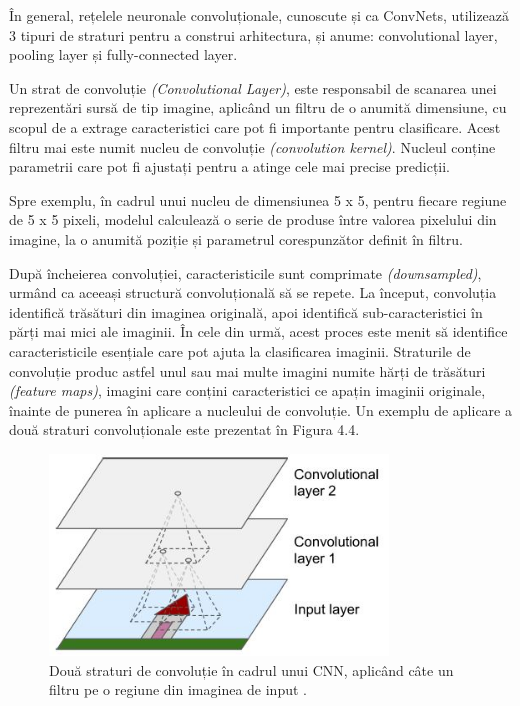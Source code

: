 \documentclass[a4paper,12pt]{report}
\begin{document}
În general, rețelele neuronale convoluționale, cunoscute și ca ConvNets, utilizează
3 tipuri de straturi pentru a construi arhitectura, și anume: convolutional layer, 
pooling layer și fully-connected layer. 

Un strat de convoluție \emph{(Convolutional Layer)}, este responsabil
de scanarea unei reprezentări sursă de tip imagine, aplicând un filtru de o anumită dimensiune,
cu scopul de a extrage caracteristici care pot fi importante pentru clasificare. Acest filtru 
mai este numit nucleu de convoluție \emph{(convolution kernel)}. Nucleul conține parametrii care
pot fi ajustați pentru a atinge cele mai precise predicții.

Spre exemplu, în cadrul unui nucleu de dimensiunea 5 x 5, pentru fiecare regiune de 5 x 5 pixeli, 
modelul calculează o serie de produse între valorea pixelului din imagine, la o anumită poziție
și parametrul corespunzător definit în filtru.

După încheierea convoluției, caracteristicile sunt comprimate \emph{(downsampled)}, urmând 
ca aceeași structură convoluțională să se repete. La început, convoluția identifică trăsături
din imaginea originală, apoi identifică sub-caracteristici în părți mai mici ale imaginii.
În cele din urmă, acest proces este
menit să identifice caracteristicile esențiale care pot ajuta la clasificarea imaginii.
Straturile de convoluție produc astfel unul sau mai multe imagini numite hărți de trăsături \emph{(feature maps)}, imagini 
care conțini caracteristici ce apațin imaginii originale, înainte de punerea în aplicare a 
nucleului de convoluție. Un exemplu de aplicare a două straturi convoluționale este 
prezentat în Figura 4.4.

\begin{figure}[h!]
    \centering
    \includegraphics[width=9cm]{..//resources//images//conv_layer.JPG} 
    \caption{Două straturi de convoluție în cadrul unui CNN, aplicând câte un filtru pe o regiune 
    din imaginea de input \cite{Hands-On-Machine-Learning}.}
\end{figure}
\end{document}
